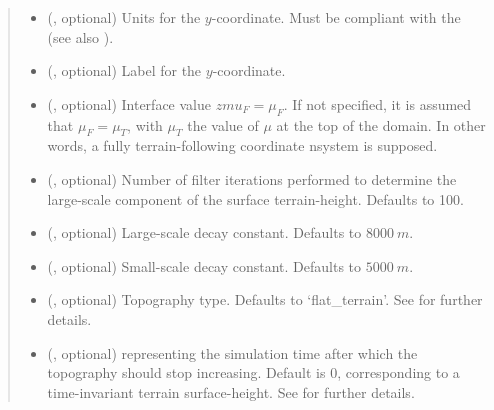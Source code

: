 \documentclass[letterpaper,10pt,english]{sphinxmanual}
\begin{document}
\begin{fulllineitems}
\begin{fulllineitems}
\begin{quote}
\begin{description}
\begin{itemize}
\item {} 
 (, optional) \textendash{} 
Units for the \(y\)-coordinate. Must be compliant with the 
(see also {\hyperref[\detokenize{api:grids.axis.Axis.__init__}]{}}).


\item {} 
 (, optional) \textendash{} Label for the \(y\)-coordinate.

\item {} 
 (, optional) \textendash{} Interface value \(zmu_F = \mu_F\). If not specified, it is assumed that \(\mu_F = \mu_T\), with
\(\mu_T\) the value of \(\mu\) at the top of the domain. In other words, a fully terrain-following
coordinate nsystem is supposed.

\item {} 
 (, optional) \textendash{} Number of filter iterations performed to determine the large-scale component of the surface terrain-height.
Defaults to 100.

\item {} 
 (, optional) \textendash{} Large-scale decay constant. Defaults to \(8000 ~ m\).

\item {} 
 (, optional) \textendash{} Small-scale decay constant. Defaults to \(5000 ~ m\).

\item {} 
 (, optional) \textendash{} Topography type. Defaults to ‘flat\_terrain’. See {\hyperref[\detokenize{api:module-grids.topography}]{}} for further details.

\item {} 
 (, optional) \textendash{}  representing the simulation time after which the topography should stop
increasing. Default is 0, corresponding to a time-invariant terrain surface-height. See {\hyperref[\detokenize{api:module-grids.topography}]{}}
for further details.


\end{itemize}
\end{description}
\end{quote}
\end{fulllineitems}
\end{fulllineitems}
\end{document}
